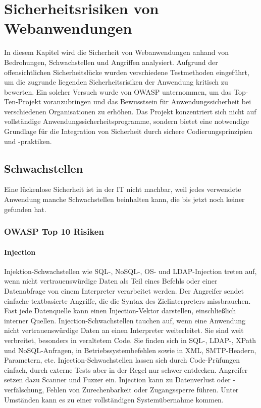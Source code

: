 \chapter{Sicherheitsrisiken von Webanwendungen}
\label{cha:k3}

In diesem Kapitel wird die Sicherheit von Webanwendungen anhand von Bedrohungen, Schwachstellen und Angriffen analysiert. Aufgrund der offensichtlichen Sicherheitslücke wurden verschiedene Testmethoden eingeführt, um die zugrunde liegenden Sicherheitsrisiken der Anwendung kritisch zu bewerten. Ein solcher Versuch wurde von OWASP unternommen, um das Top-Ten-Projekt voranzubringen und das Bewusstsein für Anwendungssicherheit bei verschiedenen Organisationen zu erhöhen. Das Projekt konzentriert sich nicht auf vollständige Anwendungssicherheitsprogramme, sondern bietet eine notwendige Grundlage für die Integration von Sicherheit durch sichere Codierungsprinzipien und -praktiken.

\section{Schwachstellen}

Eine lückenlose Sicherheit ist in der IT nicht machbar, weil jedes verwendete Anwendung manche Schwachstellen beinhalten kann, die bis jetzt noch keiner gefunden hat.

\subsection{OWASP Top 10 Risiken}

\subsubsection{Injection}

Injektion-Schwachstellen wie SQL-, NoSQL-, OS- und LDAP-Injection treten auf,  wenn nicht vertrauenswürdige Daten als Teil eines Befehls oder einer Datenabfrage von einem Interpreter verarbeitet werden\cite[6]{owasp17top10}. Der Angreifer sendet einfache textbasierte Angriffe, die die Syntax des Zielinterpreters missbrauchen. Fast jede Datenquelle kann einen Injection-Vektor darstellen, einschließlich interner Quellen. Injection-Schwachstellen tauchen auf, wenn eine Anwendung nicht vertrauenswürdige Daten an einen Interpreter weiterleitet. Sie sind weit verbreitet, besonders in veraltetem Code. Sie finden sich in SQL-, LDAP-, XPath und NoSQL-Anfragen, in Betriebssystembefehlen sowie in XML, SMTP-Headern, Parametern, etc. Injection-Schwachstellen lassen sich durch Code-Prüfungen einfach, durch externe Tests aber in der Regel nur schwer entdecken. Angreifer setzen dazu Scanner und Fuzzer ein. Injection kann zu Datenverlust oder -verfälschung, Fehlen von Zurechenbarkeit oder Zugangssperre führen. Unter Umständen kann es zu einer vollständigen Systemübernahme kommen\cite[7]{owasp17top10}.\\

